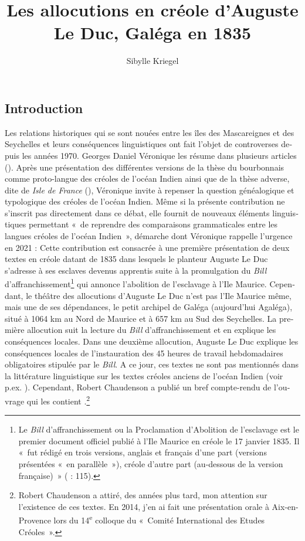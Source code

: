 \documentclass[output=paper]{langscibook}
\author{Sibylle Kriegel\affiliation{Laboratoire Parole et Langage, CNRS, Aix-Marseille Université}}
\title{Les allocutions en créole d’Auguste Le Duc, Galéga en 1835}
\begin{document}
\begin{otherlanguage}{french}
\AffiliationsWithoutIndexing{}
\lsFrenchChapterSettings{}
\maketitle 

\section{Introduction}
Les relations historiques qui se sont nouées entre les îles des Mascareignes et des Seychelles et leurs conséquences linguistiques ont fait l’objet de controverses depuis les années 1970. Georges Daniel Véronique les résume dans plusieurs articles (\citealt{Véronique2014Origine, FonSingVeronique2020, }). Après une présentation des différentes versions de la thèse du bourbonnais comme proto-langue des créoles de l’océan Indien \citep{Chaudenson1974} ainsi que de la thèse adverse, dite de \textit{Isle de France} (\citealt{BakerCorne1982}), Véronique invite à repenser la question généalogique et typologique des créoles de l’océan Indien. Même si la présente contribution ne s’inscrit pas directement dans ce débat, elle fournit de nouveaux éléments linguistiques permettant «~de reprendre des comparaisons grammaticales entre les langues créoles de l’océan Indien~», démarche dont Véronique rappelle l’urgence en 2021 \citep{Véronique2021Pour} : Cette contribution est consacrée à une première présentation de deux textes en créole datant de 1835 dans lesquels le planteur Auguste Le Duc s’adresse à ses esclaves devenus apprentis suite à la promulgation du \textit{Bill} d’affranchissement\footnote{Le \textit{Bill} d’affranchissement ou la Proclamation d’Abolition de l’esclavage est le premier document officiel publié à l’Ile Maurice en créole le 17 janvier 1835. Il «~fut rédigé en trois versions, anglais et français d’une part (versions présentées «~en parallèle~»), créole d’autre part (au-dessous de la version française)~» (\citealt{Chaudenson1981} : 115).} qui annonce l’abolition de l’esclavage à l’Ile Maurice. Cependant, le théâtre des allocutions d’Auguste Le Duc n’est pas l’Ile Maurice même, mais une de ses dépendances, le petit archipel de Galéga (aujourd’hui Agaléga), situé à 1064 km au Nord de Maurice et à 657 km au Sud des Seychelles. La première allocution suit la lecture du \textit{Bill} d’affranchissement et en explique les conséquences locales. Dans une deuxième allocution, Auguste Le Duc explique les conséquences locales de l’instauration des 45 heures de travail hebdomadaires obligatoires stipulée par le \textit{Bill}. A ce jour, ces textes ne sont pas mentionnés dans la littérature linguistique sur les textes créoles anciens de l’océan Indien (voir p.ex. \citealt{Chaudenson1981, FurlongRamharai2006, BakerEtAl2007, Davidson2021}). Cependant, Robert Chaudenson a publié un bref compte-rendu de l’ouvrage qui les contient \citep{Chaudenson1995}.\footnote{Robert Chaudenson a attiré, des années plus tard, mon attention sur l’existence de ces textes. En 2014, j’en ai fait une présentation orale à Aix-en-Provence lors du 14\textsuperscript{e} colloque du «~Comité International des Etudes Créoles~».}


\end{otherlanguage}
\end{document}
